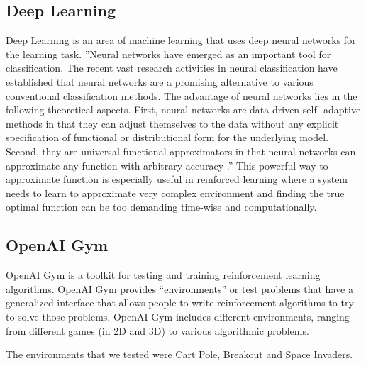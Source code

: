 \subsection{Deep Learning}
Deep Learning is an area of machine learning that uses deep neural networks for the learning task. ”Neural networks have emerged as an important tool for classification. The recent vast research activities in neural classification have established that neural networks are a promising alternative to various conventional classification methods. The advantage of neural networks lies in the following theoretical aspects. First, neural networks are data-driven self- adaptive methods in that they can adjust themselves to the data without any explicit specification of functional or distributional form for the underlying model. Second, they are universal functional approximators in that neural networks can approximate any function with arbitrary accuracy \cite{zhang2000neural}.” This powerful way to approximate function is especially useful in reinforced learning where a system needs to learn to approximate very complex environment and finding the true optimal function can be too demanding time-wise and computationally.

\subsection{OpenAI Gym}
OpenAI Gym is a toolkit for testing and training reinforcement learning algorithms. OpenAI Gym provides “environments” or test problems that have a generalized interface that allows people to write reinforcement algorithms to try to solve those problems. OpenAI Gym includes different environments, ranging from different games (in 2D and 3D) to various algorithmic problems.

The environments that we tested were Cart Pole, Breakout and Space Invaders.





